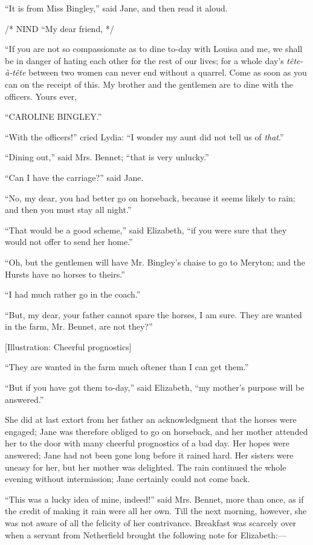 \documentclass[12pt]{book}
\begin{document}
``It is from Miss Bingley,'' said Jane, and then read it aloud.

/* NIND ``My dear friend, */

``If you are not so compassionate as to dine to-day with Louisa and me, we shall be in danger of hating each other for the rest of our lives; for a whole day's \textit{tête-à-tête} between two women can never end without a quarrel. Come as soon as you can on the receipt of this. My brother and the gentlemen are to dine with the officers. Yours ever,

``CAROLINE BINGLEY.''

``With the officers!'' cried Lydia: ``I wonder my aunt did not tell us of \textit{that}.''

``Dining out,'' said Mrs. Bennet; ``that is very unlucky.''

``Can I have the carriage?'' said Jane.

``No, my dear, you had better go on horseback, because it seems likely to rain; and then you must stay all night.''

``That would be a good scheme,'' said Elizabeth, ``if you were sure that they would not offer to send her home.''

``Oh, but the gentlemen will have Mr. Bingley's chaise to go to Meryton; and the Hursts have no horses to theirs.''

``I had much rather go in the coach.''

``But, my dear, your father cannot spare the horses, I am sure. They are wanted in the farm, Mr. Bennet, are not they?''

[Illustration: Cheerful prognostics]

``They are wanted in the farm much oftener than I can get them.''

``But if you have got them to-day,'' said Elizabeth, ``my mother's purpose will be answered.''

She did at last extort from her father an acknowledgment that the horses were engaged; Jane was therefore obliged to go on horseback, and her mother attended her to the door with many cheerful prognostics of a bad day. Her hopes were answered; Jane had not been gone long before it rained hard. Her sisters were uneasy for her, but her mother was delighted. The rain continued the whole evening without intermission; Jane certainly could not come back.

``This was a lucky idea of mine, indeed!'' said Mrs. Bennet, more than once, as if the credit of making it rain were all her own. Till the next morning, however, she was not aware of all the felicity of her contrivance. Breakfast was scarcely over when a servant from Netherfield brought the following note for Elizabeth:---
\end{document}
